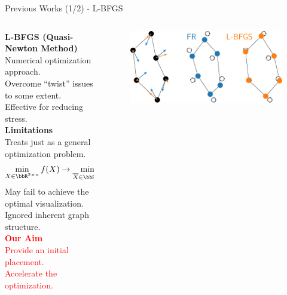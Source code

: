 \documentclass[dvipdfmx,13pt,aspectratio=169]{beamer}
\newcommand{\red}[1]{\textcolor{red}{#1}}
\newif\ifShowHidden
\begin{document}
\ifShowHidden
  \begin{frame}{``Twist'' Causes Stagnation}
    \large{%
      \textbf{Twist}: unnecessary folded and tangled structures~\cite{veldhuizenDynamicMultilevelGraph2007,cheongSnapshotVisualizationComplex2018}.\\
      $\to$ Causing stagnation of the simulation process.\\
      Slow for large-scale graphs. $\order{\abs{V}^2}$ per iteration.
    }
    \begin{figure}[htbp]
      \centering
      \animategraphics[autoplay,loop,width=0.4\columnwidth]{5}{circle/circle-}{1}{1}
    \end{figure}
  \end{frame}
\fi

\ifShowHidden
  \begin{frame}{Previous Works (1/2) - L-BFGS}
    \begin{columns}
      \begin{column}{0.6\columnwidth}
        \large{\textbf{L-BFGS (Quasi-Newton Method)}}~\cite{6183577}\\
        \quad Numerical optimization approach.\\
        \quad Overcome ``twist'' issues to some extent.\\
        \quad Effective for reducing stress.\\[1.5em]
        \textbf{Limitations}\\
        \quad Treats just as a general optimization problem.
        \begin{equation*}
          \min_{X \in \bbR^{2\times n}} f(X) \to \min_{\overline{X} \in \bbR^{2n}} \overline{f}(\overline{X})
        \end{equation*}
        \quad May fail to achieve the optimal visualization.\\
        \quad Ignored inherent graph structure.\\[1.5em]
        \textbf{\red{Our Aim}}\\
        \quad \red{Provide an initial placement.}\\
        \quad \red{Accelerate the optimization.}
      \end{column}
      \begin{column}{0.4\columnwidth}
        \begin{figure}[htbp]
          \centering
          \includegraphics[width=\columnwidth]{../main/comparison/comparison_FRandLBFGS.pdf}
        \end{figure}
      \end{column}
    \end{columns}
  \end{frame}
\end{document}
